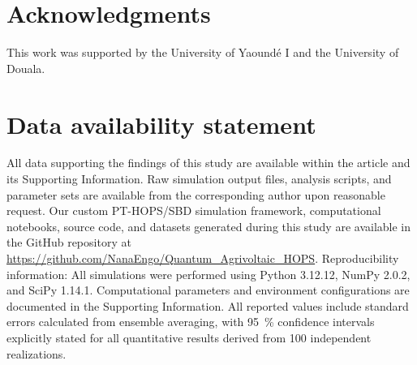 \documentclass[11pt,a4paper]{article}
\begin{document}









\section*{Acknowledgments}

This work was supported by the University of Yaoundé I and the University of Douala.


\section*{Data availability statement}

All data supporting the findings of this study are available within the article and its Supporting Information. Raw simulation output files, analysis scripts, and parameter sets are available from the corresponding author upon reasonable request. Our custom PT-HOPS/SBD simulation framework, computational notebooks, source code, and datasets generated during this study are available in the GitHub repository at \url{https://github.com/NanaEngo/Quantum_Agrivoltaic_HOPS}. Reproducibility information: All simulations were performed using Python 3.12.12, NumPy 2.0.2, and SciPy 1.14.1. Computational parameters and environment configurations are documented in the Supporting Information. All reported values include standard errors calculated from ensemble averaging, with \SI{95}{\percent} confidence intervals explicitly stated for all quantitative results derived from \num{100} independent realizations.

\end{document}
